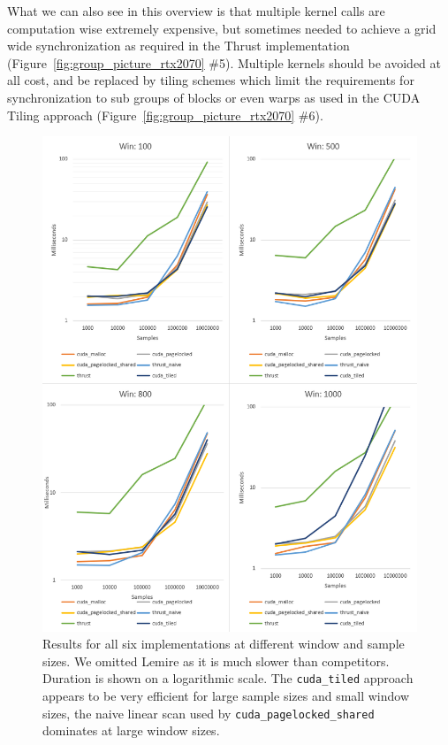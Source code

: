 What we can also see in this overview is that multiple kernel calls are computation wise extremely expensive, but sometimes needed to achieve a grid wide synchronization as required in the Thrust implementation (Figure~\ref{fig:group_picture_rtx2070} \#5). Multiple kernels should be avoided at all cost, and be replaced by tiling schemes which limit the requirements for synchronization to sub groups of blocks or even warps as used in the CUDA Tiling approach (Figure~\ref{fig:group_picture_rtx2070} \#6). 

\begin{figure}
    \centering
    \includegraphics[width=1.0\linewidth]{Figures/rtx2070_ms_vs_samples.png}
    \caption{Results for all six implementations at different window and sample sizes. We omitted Lemire as it is much slower than competitors. Duration is shown on a logarithmic scale. The \texttt{cuda\_tiled} approach appears to be very efficient for large sample sizes and small window sizes, the naive linear scan used by \texttt{cuda\_pagelocked\_shared} dominates at large window sizes.}
    \label{fig:rtx2070_ms_vs_samples}
\end{figure}

